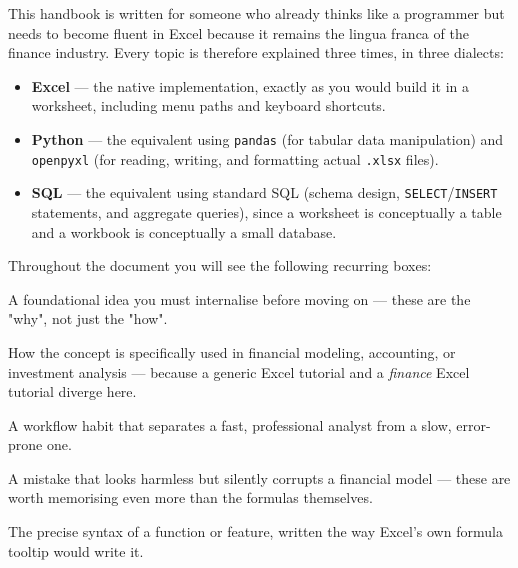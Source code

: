 \documentclass[11pt,a4paper]{article}
\begin{document}
This handbook is written for someone who already thinks like a programmer but needs to become fluent in Excel because it remains the lingua franca of the finance industry. Every topic is therefore explained three times, in three dialects:

\begin{itemize}
  \item \textbf{Excel} --- the native implementation, exactly as you would build it in a worksheet, including menu paths and keyboard shortcuts.
  \item \textbf{Python} --- the equivalent using \texttt{pandas} (for tabular data manipulation) and \texttt{openpyxl} (for reading, writing, and formatting actual \texttt{.xlsx} files).
  \item \textbf{SQL} --- the equivalent using standard SQL (schema design, \texttt{SELECT}/\texttt{INSERT} statements, and aggregate queries), since a worksheet is conceptually a table and a workbook is conceptually a small database.
\end{itemize}

Throughout the document you will see the following recurring boxes:

\begin{keyconcept}
A foundational idea you must internalise before moving on --- these are the "why", not just the "how".
\end{keyconcept}

\begin{financeapp}
How the concept is specifically used in financial modeling, accounting, or investment analysis --- because a generic Excel tutorial and a \emph{finance} Excel tutorial diverge here.
\end{financeapp}

\begin{protip}
A workflow habit that separates a fast, professional analyst from a slow, error-prone one.
\end{protip}

\begin{pitfall}
A mistake that looks harmless but silently corrupts a financial model --- these are worth memorising even more than the formulas themselves.
\end{pitfall}

\begin{formulasyntax}
The precise syntax of a function or feature, written the way Excel's own formula tooltip would write it.
\end{formulasyntax}
\end{document}
